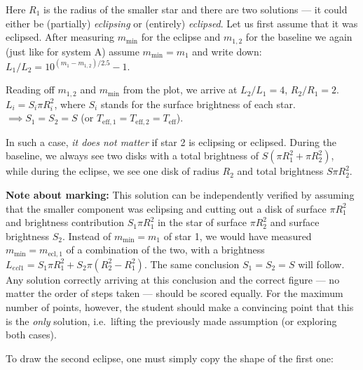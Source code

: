 Here $R_1$ is the radius of the smaller star and there are two solutions --- it
could either be (partially) \emph{eclipsing} or (entirely) \emph{eclipsed}.
Let us first assume that it was eclipsed. After measuring $m_{\min}$ for the
eclipse and $m_{1,2}$ for the baseline we again (just like for system A) assume
$m_{\min} = m_1$ and write down: $L_1/L_2 = 10^{(m_1 - m_{1,2})/2.5} - 1$.

Reading off $m_{1,2}$ and $m_{\min}$ from the plot, we arrive at $L_2/L_1 = 4$,
$R_2/R_1 = 2$.\\
$L_i = S_i \pi R_i^2$, where $S_i$ stands for the surface brightness of each
star.\\
$\implies S_1 = S_2 = S$ (or
$T_{\mathrm{eff},1} = T_{\mathrm{eff},2} = T_{\mathrm{eff}}$).

In such a case, \emph{it does not matter} if star 2 is eclipsing or eclipsed.
During the baseline, we always see two disks with a total brightness of
$S(\pi R_1^2 + \pi R_2^2)$, while during the eclipse, we see one disk of radius
$R_2$ and total brightness $S\pi R_2^2$.

\textbf{Note about marking:} This solution can be independently verified by
assuming that the smaller component was eclipsing and cutting out a disk of
surface $\pi R_1^2$ and brightness contribution $S_1 \pi R_1^2$ in the star of
surface $\pi R_2^2$ and surface brightness $S_2$. Instead of
$m_{\min} = m_1$ of star 1, we would have measured
$m_{\min} = m_{\mathrm{ecl},1}$ of a combination of the two, with a brightness
$L_{ecl1} = S_1 \pi R_1^2 + S_2 \pi (R_2^2 - R_1^2)$. The same conclusion
$S_1 = S_2 = S$ will follow. Any solution correctly arriving at this conclusion
and the correct figure --- no matter the order of steps taken --- should be
scored equally. For the maximum number of points, however, the student should
make a convincing point that this is the \emph{only} solution, i.e.\ lifting
the previously made assumption (or exploring both cases).

To draw the second eclipse, one must simply copy the shape of the first one:


